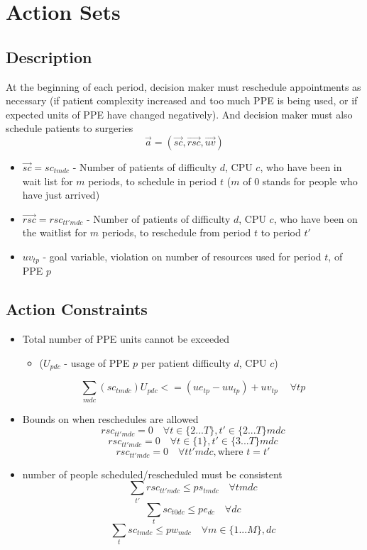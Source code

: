 \documentclass{article}
\begin{document}
\section{Action Sets}

\subsection{Description}
At the beginning of each period, decision maker must reschedule appointments as necessary (if patient complexity increased and too much PPE is being used, or if expected units of PPE have changed negatively). And decision maker must also schedule patients to surgeries
\[ \vec{a} = (\vec{sc}, \vec{rsc}, \vec{uv}) \]
\begin{itemize}
    \item $\vec{sc} = sc_{tmdc}$ - Number of patients of difficulty $d$, CPU $c$, who have been in wait list for $m$ periods, to schedule in period $t$ ($m$ of 0 stands for people who have just arrived)
	\item $\vec{rsc} = rsc_{tt'mdc}$ - Number of patients of difficulty $d$, CPU $c$, who have been on the waitlist for $m$ periods, to reschedule from period $t$ to period $t'$
	\item $uv_{tp}$ - goal variable, violation on number of resources used for period $t$, of PPE $p$
\end{itemize}

\subsection{Action Constraints}
\begin{itemize}
    \item Total number of PPE units cannot be exceeded  
    \begin{itemize}
    	\item ($U_{pdc}$ - usage of PPE $p$ per patient difficulty $d$, CPU $c$)
    \end{itemize}
        \[ \sum_{mdc}(sc_{tmdc})U_{pdc} <= (ue_{tp} - uu_{tp}) + uv_{tp}\ \quad \forall tp \]
	\item Bounds on when reschedules are allowed
		\[ rsc_{tt'mdc} = 0 \quad \forall t \in \{ 2...T \}, t' \in \{2...T\} mdc \]
		\[ rsc_{tt'mdc} = 0 \quad \forall t \in \{ 1 \}, t'\in \{ 3...T \} mdc \]
		\[ rsc_{tt'mdc} = 0 \quad \forall tt'mdc, \text{where } t=t' \]
	
	\item number of people scheduled/rescheduled must be consistent
		\[ \sum_{t'} rsc_{tt'mdc} \le ps_{tmdc} \quad \forall tmdc \]
		\[ \sum_{t} sc_{t0dc} \le pe_{dc} \quad \forall dc \]
		\[ \sum_{t} sc_{tmdc} \le pw_{mdc} \quad \forall m \in \{1...M \}, dc \]
\end{itemize}
\end{document}

